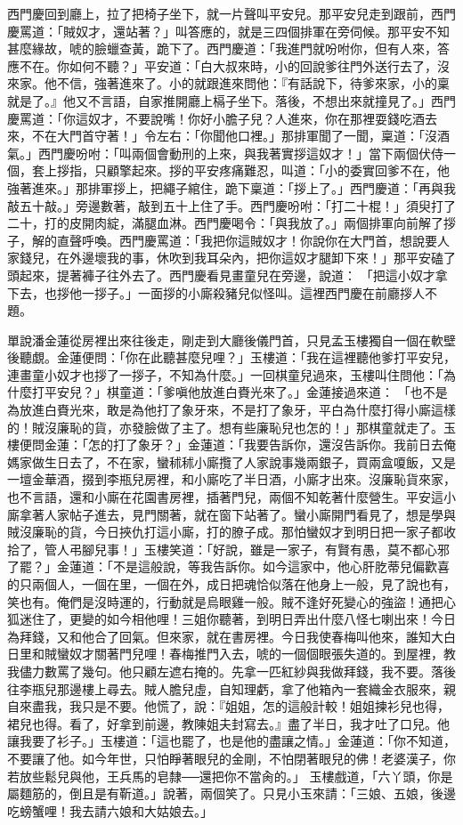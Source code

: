 西門慶回到廳上，拉了把椅子坐下，就一片聲叫平安兒。那平安兒走到跟前，西門慶罵道：「賊奴才，還站著？」叫答應的，就是三四個排軍在旁伺候。那平安不知甚麼緣故，唬的臉蠟查黃，跪下了。西門慶道：「我進門就吩咐你，但有人來，答應不在。你如何不聽？」平安道：「白大叔來時，小的回說爹往門外送行去了，沒來家。他不信，強著進來了。小的就跟進來問他：『有話說下，待爹來家，小的稟就是了。』他又不言語，自家推開廳上槅子坐下。落後，不想出來就撞見了。」西門慶罵道：「你這奴才，不要說嘴！你好小膽子兒？人進來，你在那裡耍錢吃酒去來，不在大門首守著！」令左右：「你聞他口裡。」那排軍聞了一聞，稟道：「沒酒氣。」西門慶吩咐：「叫兩個會動刑的上來，與我著實拶這奴才！」當下兩個伏侍一個，套上拶指，只顧擎起來。拶的平安疼痛難忍，叫道：「小的委實回爹不在，他強著進來。」那排軍拶上，把繩子綰住，跪下稟道：「拶上了。」西門慶道：「再與我敲五十敲。」旁邊數著，敲到五十上住了手。西門慶吩咐：「打二十棍！」須臾打了二十，打的皮開肉綻，滿腿血淋。西門慶喝令：「與我放了。」兩個排軍向前解了拶子，解的直聲呼喚。西門慶罵道：「我把你這賊奴才！你說你在大門首，想說要人家錢兒，在外邊壞我的事，休吹到我耳朵內，把你這奴才腿卸下來！」那平安磕了頭起來，提著褲子往外去了。西門慶看見畫童兒在旁邊，說道： 「把這小奴才拿下去，也拶他一拶子。」一面拶的小廝殺豬兒似怪叫。這裡西門慶在前廳拶人不題。

單說潘金蓮從房裡出來往後走，剛走到大廳後儀門首，只見孟玉樓獨自一個在軟壁後聽覷。金蓮便問：「你在此聽甚麼兒哩？」玉樓道：「我在這裡聽他爹打平安兒，連畫童小奴才也拶了一拶子，不知為什麼。」一回棋童兒過來，玉樓叫住問他：「為什麼打平安兒？」棋童道：「爹嗔他放進白賚光來了。」金蓮接過來道： 「也不是為放進白賚光來，敢是為他打了象牙來，不是打了象牙，平白為什麼打得小廝這樣的！賊沒廉恥的貨，亦發臉做了主了。想有些廉恥兒也怎的！」那棋童就走了。玉樓便問金蓮：「怎的打了象牙？」金蓮道：「我要告訴你，還沒告訴你。我前日去俺媽家做生日去了，不在家，蠻秫秫小廝攬了人家說事幾兩銀子，買兩盒嗄飯，又是一壇金華酒，掇到李瓶兒房裡，和小廝吃了半日酒，小廝才出來。沒廉恥貨來家，也不言語，還和小廝在花園書房裡，插著門兒，兩個不知乾著什麼營生。平安這小廝拿著人家帖子進去，見門關著，就在窗下站著了。蠻小廝開門看見了，想是學與賊沒廉恥的貨，今日挾仇打這小廝，打的膫子成。那怕蠻奴才到明日把一家子都收拾了，管人弔腳兒事！」玉樓笑道：「好說，雖是一家子，有賢有愚，莫不都心邪了罷？」金蓮道：「不是這般說，等我告訴你。如今這家中，他心肝肐蒂兒偏歡喜的只兩個人，一個在里，一個在外，成日把魂恰似落在他身上一般，見了說也有，笑也有。俺們是沒時運的，行動就是烏眼雞一般。賊不逢好死變心的強盜！通把心狐迷住了，更變的如今相他哩！三姐你聽著，到明日弄出什麼八怪七喇出來！今日為拜錢，又和他合了回氣。但來家，就在書房裡。今日我使春梅叫他來，誰知大白日里和賊蠻奴才關著門兒哩！春梅推門入去，唬的一個個眼張失道的。到屋裡，教我儘力數罵了幾句。他只顧左遮右掩的。先拿一匹紅紗與我做拜錢，我不要。落後往李瓶兒那邊樓上尋去。賊人膽兒虛，自知理虧，拿了他箱內一套織金衣服來，親自來盡我，我只是不要。他慌了，說：『姐姐，怎的這般計較！姐姐揀衫兒也得，裙兒也得。看了，好拿到前邊，教陳姐夫封寫去。』盡了半日，我才吐了口兒。他讓我要了衫子。」玉樓道：「這也罷了，也是他的盡讓之情。」金蓮道：「你不知道，不要讓了他。如今年世，只怕睜著眼兒的金剛，不怕閉著眼兒的佛！老婆漢子，你若放些鬆兒與他，王兵馬的皂隸──還把你不當肏的。」 玉樓戲道，「六丫頭，你是屬麵筋的，倒且是有靳道。」說著，兩個笑了。只見小玉來請：「三娘、五娘，後邊吃螃蟹哩！我去請六娘和大姑娘去。」

